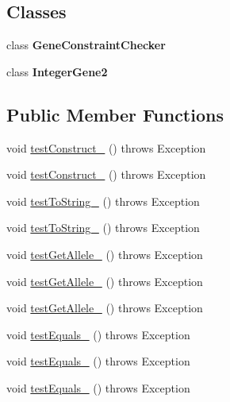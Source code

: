\subsection*{Classes}
\begin{DoxyCompactItemize}
\item 
class {\bfseries Gene\-Constraint\-Checker}
\item 
class {\bfseries Integer\-Gene2}
\end{DoxyCompactItemize}
\subsection*{Public Member Functions}
\begin{DoxyCompactItemize}
\item 
void \hyperlink{classorg_1_1jgap_1_1impl_1_1_integer_gene_test_a4353ea34add5cb2e65b0fbc6e2c47416}{test\-Construct\-\_} ()  throws Exception 
\item 
void \hyperlink{classorg_1_1jgap_1_1impl_1_1_integer_gene_test_a99653f60e6ade28f1457a161f2c5ebcf}{test\-Construct\-\_} ()  throws Exception 
\item 
void \hyperlink{classorg_1_1jgap_1_1impl_1_1_integer_gene_test_a3fd5156ee718a318eaebb503dae8e23d}{test\-To\-String\-\_} ()  throws Exception 
\item 
void \hyperlink{classorg_1_1jgap_1_1impl_1_1_integer_gene_test_a3070c9d8379c60b832d95e0b85bdc0c3}{test\-To\-String\-\_} ()  throws Exception 
\item 
void \hyperlink{classorg_1_1jgap_1_1impl_1_1_integer_gene_test_a7c55bb8369e77722d154f156a5fdc8fe}{test\-Get\-Allele\-\_} ()  throws Exception 
\item 
void \hyperlink{classorg_1_1jgap_1_1impl_1_1_integer_gene_test_a2e00b7f855533a0de802d7a0568634f0}{test\-Get\-Allele\-\_} ()  throws Exception 
\item 
void \hyperlink{classorg_1_1jgap_1_1impl_1_1_integer_gene_test_a088080488b4a4ad78782bb171aef5fd0}{test\-Get\-Allele\-\_} ()  throws Exception 
\item 
void \hyperlink{classorg_1_1jgap_1_1impl_1_1_integer_gene_test_a07cdc9dd7b3b12cc13ae476998c3e353}{test\-Equals\-\_} ()  throws Exception 
\item 
void \hyperlink{classorg_1_1jgap_1_1impl_1_1_integer_gene_test_a4cacfa33fd2d4c87b7e720b433e4e65f}{test\-Equals\-\_} ()  throws Exception 
\item 
void \hyperlink{classorg_1_1jgap_1_1impl_1_1_integer_gene_test_ab7e833bb80bd13b6ed6e6f357bdbec40}{test\-Equals\-\_} ()  throws Exception 

\end{DoxyCompactItemize}
